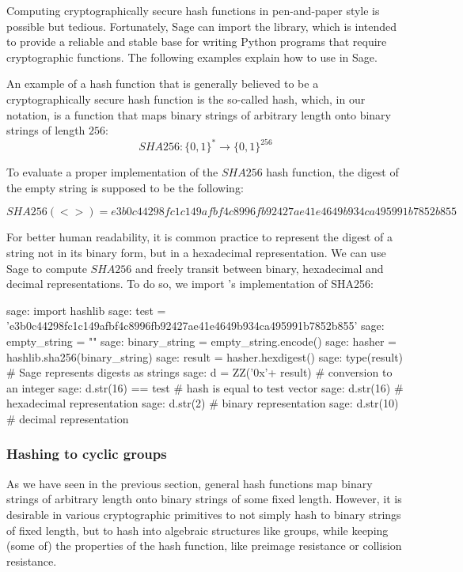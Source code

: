 Computing cryptographically secure hash functions in pen-and-paper style is possible but tedious. Fortunately, Sage can import the  library, which is intended to provide a reliable and stable base for writing Python programs that require cryptographic functions. The following examples explain how to use  in Sage.

\begin{example}\label{ex:SHA256}An example of a hash function that is generally believed to be a cryptographically secure hash function is the so-called  hash, which, in our notation, is a function that maps binary strings of arbitrary length onto binary strings of length $256$:
\begin{equation}
SHA256: \{0,1\}^* \to \{0,1\}^{256}
\end{equation}

 To evaluate a proper implementation of the $SHA256$ hash function, the digest of the empty string is supposed to be the following:
 
\begin{equation}
SHA256(<>)= {\scriptstyle e3b0c44298fc1c149afbf4c8996fb92427ae41e4649b934ca495991b7852b855}
\end{equation}

For better human readability, it is common practice to represent the digest of a string not in its binary form, but in a hexadecimal representation. We can use Sage to compute $SHA256$ and freely transit between binary, hexadecimal and decimal representations. To do so, we import 's implementation of SHA256:
\begin{sagecommandline}
sage: import hashlib
sage: test = 'e3b0c44298fc1c149afbf4c8996fb92427ae41e4649b934ca495991b7852b855' 
sage: empty_string = ""
sage: binary_string = empty_string.encode()
sage: hasher = hashlib.sha256(binary_string) 
sage: result = hasher.hexdigest()
sage: type(result)	# Sage represents digests as strings
sage: d = ZZ('0x'+ result) # conversion to an integer
sage: d.str(16) == test	# hash is equal to test vector
sage: d.str(16) # hexadecimal representation
sage: d.str(2) # binary representation
sage: d.str(10) # decimal representation
\end{sagecommandline}
\end{example}

\subsubsection{Hashing to cyclic groups} As we have seen in the previous section, general hash functions map binary strings of arbitrary length onto binary strings of some fixed length. However, it is desirable in various cryptographic primitives to not simply hash to binary strings of fixed length, but to hash into algebraic structures like groups, while keeping (some of) the properties of the hash function, like preimage resistance or collision resistance.


